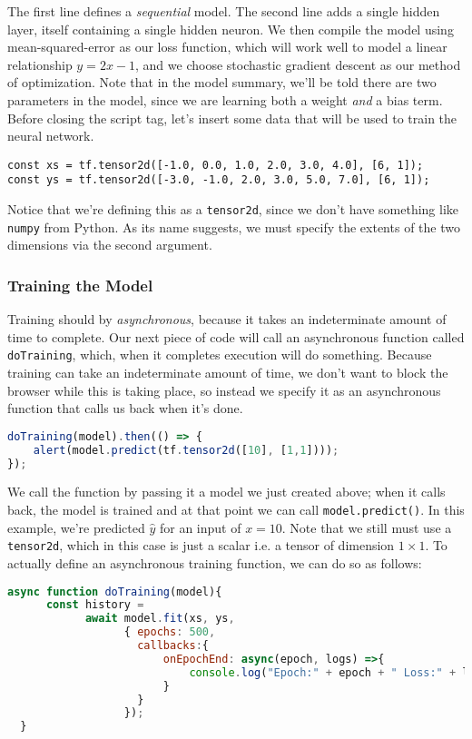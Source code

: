 \documentclass[12pt]{article}
\begin{document}
The first line defines a \emph{sequential} model. The second line adds a single hidden layer, itself containing a single hidden neuron. We then compile the model using mean-squared-error as our loss function, which will work well to model a linear relationship $y=2x-1$, and we choose stochastic gradient descent as our method of optimization. Note that in the model summary, we'll be told there are two parameters in the model, since we are learning both a weight \emph{and} a bias term. Before closing the script tag, let's insert some data that will be used to train the neural network.

\begin{verbatim}
const xs = tf.tensor2d([-1.0, 0.0, 1.0, 2.0, 3.0, 4.0], [6, 1]);
const ys = tf.tensor2d([-3.0, -1.0, 2.0, 3.0, 5.0, 7.0], [6, 1]);
\end{verbatim}
Notice that we're defining this as a \texttt{tensor2d}, since we don't have something like \texttt{numpy} from Python. As its name suggests, we must specify the extents of the two dimensions via the second argument.

\subsubsection{Training the Model} Training should by \emph{asynchronous}, because it takes an indeterminate amount of time to complete. Our next piece of code will call an asynchronous function called \texttt{doTraining}, which, when it completes execution will do something. Because training can take an indeterminate amount of time, we don't want to block the browser while this is taking place, so instead we specify it as an asynchronous function that calls us back when it's done.
\begin{lstlisting}[language=JavaScript]
doTraining(model).then(() => {
    alert(model.predict(tf.tensor2d([10], [1,1])));
});
\end{lstlisting}
We call the function by passing it a model we just created above; when it calls back, the model is trained and at that point we can call \texttt{model.predict()}. In this example, we're predicted $\hat y$ for an input of $x = 10$. Note that we still must use a \texttt{tensor2d}, which in this case is just a scalar i.e. a tensor of dimension $1 \times 1$. To actually define an asynchronous training function, we can do so as follows:

\begin{lstlisting}[language=JavaScript]
  async function doTraining(model){
      const history =
            await model.fit(xs, ys,
                  { epochs: 500,
                    callbacks:{
                        onEpochEnd: async(epoch, logs) =>{
                            console.log("Epoch:" + epoch + " Loss:" + logs.loss);
                        }
                    }
                  });
  }
\end{lstlisting}
\end{document}
